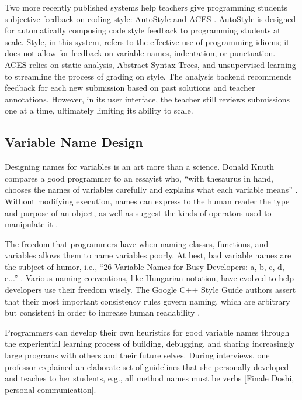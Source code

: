 Two more recently published systems help teachers give programming students subjective feedback on coding style: AutoStyle \cite{autostyle} and ACES \cite{ACES}. AutoStyle is designed for automatically composing code style feedback to programming students at scale. Style, in this system, refers to the effective use of programming idioms; it does not allow for feedback on variable names, indentation, or punctuation. ACES relies on static analysis, Abstract Syntax Trees, and unsupervised learning to streamline the process of grading on style. The analysis backend recommends feedback for each new submission based on past solutions and teacher annotations. However, in its user interface, the teacher still reviews submissions one at a time, ultimately limiting its ability to scale.



\subsection{Variable Name Design}
Designing names for variables is an art more than a science. Donald Knuth compares a good programmer to an essayist who, ``with thesaurus in hand, chooses the names of variables carefully and explains what each variable means'' \cite{literateprogramming}. Without modifying execution, names can express to the human reader the type and purpose of an object, as well as suggest the kinds of operators used to manipulate it \cite{operands}.

The freedom that programmers have when naming classes, functions, and variables allows them to name variables poorly. At best, bad variable names are the subject of humor, i.e., ``26 Variable Names for Busy Developers: a, b, c, d, e...'' \cite{hackeronion}. Various naming conventions, like Hungarian notation, have evolved to help developers use their freedom wisely. The Google C++ Style Guide authors assert that their most important consistency rules govern naming, which are arbitrary but consistent in order to increase human readability \cite{GoogleCStyleGuide}.

Programmers can develop their own heuristics for good variable names through the experiential learning process of building, debugging, and sharing increasingly large programs with others and their future selves. During interviews, one professor explained an elaborate set of guidelines that she personally developed and teaches to her students, e.g., all method names must be verbs [Finale Doshi, personal communication].

